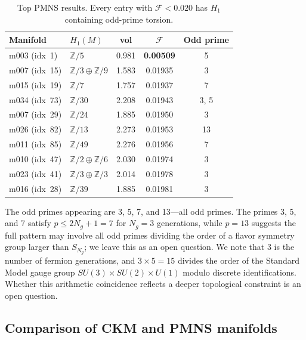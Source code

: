 \documentclass[11pt,a4paper]{article}
\begin{document}
\begin{table}[!t]
\centering
\caption{Top PMNS results. Every entry with $\mathcal{F} < 0.020$
has $H_1$ containing odd-prime torsion.}
\label{tab:homology_pattern}
\begin{tabular}{llccc}
\toprule
Manifold & $H_1(M)$ & vol & $\mathcal{F}$ & Odd prime \\
\midrule
m003 (idx~1)  & $\mathbb{Z}/5$                          & 0.981 & \textbf{0.00509} & 5 \\
m007 (idx~15) & $\mathbb{Z}/3\oplus\mathbb{Z}/9$        & 1.583 & 0.01935 & 3 \\
m015 (idx~19) & $\mathbb{Z}/7$                          & 1.757 & 0.01937 & 7 \\
m034 (idx~73) & $\mathbb{Z}/30$                         & 2.208 & 0.01943 & 3, 5 \\
m007 (idx~29) & $\mathbb{Z}/24$                         & 1.885 & 0.01950 & 3 \\
m026 (idx~82) & $\mathbb{Z}/13$                         & 2.273 & 0.01953 & 13 \\
m011 (idx~85) & $\mathbb{Z}/49$                         & 2.276 & 0.01956 & 7 \\
m010 (idx~47) & $\mathbb{Z}/2\oplus\mathbb{Z}/6$        & 2.030 & 0.01974 & 3 \\
m023 (idx~41) & $\mathbb{Z}/3\oplus\mathbb{Z}/3$        & 2.014 & 0.01978 & 3 \\
m016 (idx~28) & $\mathbb{Z}/39$                         & 1.885 & 0.01981 & 3 \\
\bottomrule
\end{tabular}
\end{table}

The odd primes appearing are 3, 5, 7, and 13---all odd primes.
The primes 3, 5, and 7 satisfy $p \leq 2N_g + 1 = 7$ for $N_g = 3$
generations, while $p = 13$ suggests the full pattern may involve
all odd primes dividing the order of a flavor symmetry group larger
than $S_{N_g}$; we leave this as an open question.
We note that 3 is the number of fermion generations, and
$3 \times 5 = 15$ divides the order of the Standard Model gauge group
$SU(3)\times SU(2)\times U(1)$ modulo discrete identifications.
Whether this arithmetic coincidence reflects a deeper topological
constraint is an open question.

\subsection{Comparison of CKM and PMNS manifolds}
\end{document}
